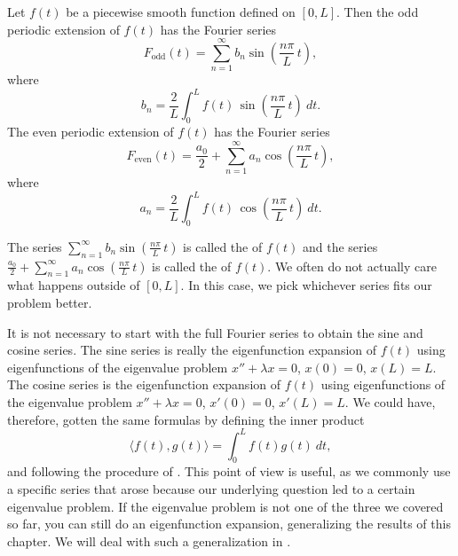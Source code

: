 \begin{theorem}
Let $f(t)$ be a piecewise smooth function defined on $[0,L]$.
Then the odd periodic extension
of $f(t)$ has the Fourier series
\begin{equation*}
\boxed{~~
F_{\text{odd}}(t) = \sum_{n=1}^\infty b_n \sin \left( \frac{n \pi}{L} \, t
\right) ,
~~}
\end{equation*}
where
\begin{equation*}
\boxed{~~
b_n = 
\frac{2}{L} \int_{0}^L f(t)\, \sin \left( \frac{n \pi}{L} \, t \right) ~ dt .
~~}
\end{equation*}
The even periodic extension of $f(t)$ has the Fourier series
\begin{equation*}
\boxed{~~
F_{\text{even}}(t) = \frac{a_0}{2} + \sum_{n=1}^\infty a_n \cos \left(
\frac{n \pi}{L} \, t \right) ,
~~}
\end{equation*}
where
\begin{equation*}
\boxed{~~
a_n = 
\frac{2}{L} \int_{0}^L f(t)\, \cos \left( \frac{n \pi}{L} \, t \right) ~ dt .
~~}
\end{equation*}
\end{theorem}

The series $\sum_{n=1}^\infty b_n \sin \left( \frac{n \pi}{L} \, t\right)$ is called
the \emph{} of $f(t)$ and the series
$\frac{a_0}{2} + \sum_{n=1}^\infty a_n \cos \left( \frac{n \pi}{L} \, t
\right)$
is called the \emph{} of $f(t)$.  
We often do not actually care what happens outside of $[0,L]$.  In this case,
we pick whichever series fits our problem better.

It is not necessary to start with the full Fourier series to obtain
the sine and cosine series.
The sine series is really the eigenfunction expansion of $f(t)$ using 
eigenfunctions of the eigenvalue problem $x''+\lambda x = 0$, $x(0) = 0$,
$x(L) = L$.  The cosine series is the eigenfunction expansion of $f(t)$
using 
eigenfunctions of the eigenvalue problem $x''+\lambda x = 0$, $x'(0) = 0$,
$x'(L) = L$.  We could have, therefore, gotten the same formulas
by defining the inner product
\begin{equation*}
\langle f(t), g(t) \rangle = \int_0^L f(t) g(t) ~ dt ,
\end{equation*}
and following the procedure of .  This point of view is
useful, as we commonly use a specific series that arose because our underlying
question 
led to a certain eigenvalue problem.  If the eigenvalue 
problem is not one of the three we covered so far, you can still do an
eigenfunction expansion, generalizing the results of this chapter.  We will
deal with such a generalization in .

